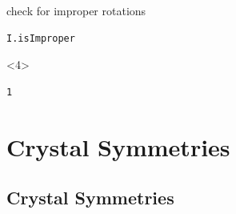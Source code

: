 \documentclass[compress]{beamer}
\begin{document}
\begin{frame}[fragile]
\begin{overlayarea}{\textwidth}{7cm}
  \pause
  \bigskip

  check for improper rotations
\begin{lstlisting}[style=input]
I.isImproper
  \end{lstlisting}
  \begin{onlyenv}<4>
    \vspace{-0.3cm}
    \begin{lstlisting}[style=output]
  1
  \end{lstlisting}
  \end{onlyenv}

\end{overlayarea}
\end{frame}

\section{Crystal Symmetries}
\label{sec:symmetries}

\subsection*{Crystal Symmetries}
\label{sec:crystal-symmetries}
\end{document}
